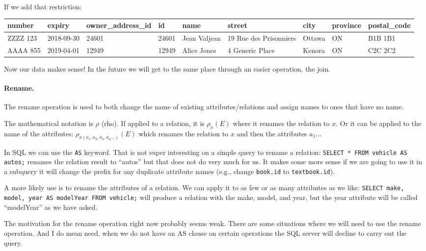 If we add that restriction:

{\scriptsize
\begin{center}
	\begin{tabular}{|l|l|l|l|l|l|l|l|l|}\hline
		\textbf{number} & \textbf{expiry} & \textbf{owner\_address\_id} & \textbf{id} & \textbf{name} &\textbf{street} & \textbf{city} & \textbf{province} & \textbf{postal\_code} \\ \hline
		ZZZZ 123 & 2018-09-30 & 24601 & 24601 & Jean Valjean & 19 Rue des Prisonniers & Ottawa & ON & B1B 1B1\\ \hline
		AAAA 855 & 2019-04-01 & 12949 & 12949 & Alice Jones & 4 Generic Place & Kenora & ON & C2C 2C2\\ \hline
	\end{tabular}
\end{center}
}

Now our data makes sense! In the future we will get to the same place through an easier operation, the join.

\paragraph{Rename.} The rename operation is used to both change the name of existing attributes/relations and assign names to ones that have no name. 

The mathematical notation is $\rho$ (rho). If applied to a relation, it is $\rho_{x}(E)$ where it renames the relation to $x$. Or it can be applied to the name of the attributes: $\rho_{x(a_{1}, a_{2}, a_{3}, a_{4}...)}(E)$ which renames the relation to $x$ and then the attributes $a_{1}$...

In SQL we can use the \texttt{AS} keyword. That is not super interesting on a simple query to rename a relation: \texttt{SELECT * FROM vehicle AS autos;} renames the relation result to ``autos'' but that does not do very much for us. It makes some more sense if we are going to use it in a subquery it will change the prefix for any duplicate attribute names (e.g., change \texttt{book.id} to \texttt{textbook.id}). 

A more likely use is to rename the attributes of a relation. We can apply it to as few or as many attributes as we like: \texttt{SELECT make, model, year AS modelYear FROM vehicle;} will produce a relation with the make, model, and year, but the year attribute will be called ``modelYear'' as we have asked.

The motivation for the rename operation right now probably seems weak. There are some situations where we will need to use the rename operation. And I do mean need, when we do not have an AS clause on certain operations the SQL server will decline to carry out the query.

